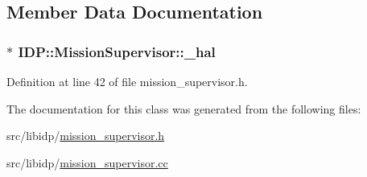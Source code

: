 \subsection{Member Data Documentation}
\hypertarget{classIDP_1_1MissionSupervisor_a31c1a6a71d93c8ae4024eb97b934eb56}{
\subsubsection[{\_\-hal}]{$\ast$ {\bf IDP::MissionSupervisor::\_\-hal}}}
\label{classIDP_1_1MissionSupervisor_a31c1a6a71d93c8ae4024eb97b934eb56}


Definition at line 42 of file mission\_\-supervisor.h.



The documentation for this class was generated from the following files:\begin{DoxyCompactItemize}
\item 
src/libidp/\hyperlink{mission__supervisor_8h}{mission\_\-supervisor.h}\item 
src/libidp/\hyperlink{mission__supervisor_8cc}{mission\_\-supervisor.cc}\end{DoxyCompactItemize}
